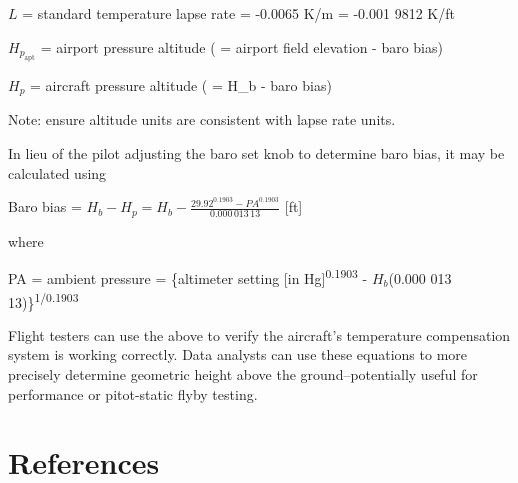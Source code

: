 \documentclass[
]{book}
\begin{document}
\(L\) = standard temperature lapse rate = -0.0065 K/m = -0.001 9812 K/ft

\(H_{p_{\mathrm{apt}}}\) = airport pressure altitude ( = airport field elevation - baro bias)

\(H_p\) = aircraft pressure altitude ( = H\_b - baro bias)

Note: ensure altitude units are consistent with lapse rate units.

In lieu of the pilot adjusting the baro set knob to determine baro bias, it may be calculated using

Baro bias = \(H_b - H_p = H_b - \frac{29.92^{0.1903} - PA^{0.1903}}{0.000\,013\,13}\) {[}ft{]}

where

PA = ambient pressure = \{altimeter setting {[}in Hg{]}\textsuperscript{0.1903} - \(H_b\)(0.000 013 13)\}\textsuperscript{1/0.1903}

Flight testers can use the above to verify the aircraft's temperature compensation system is working correctly. Data analysts can use these equations to more precisely determine geometric height above the ground--potentially useful for performance or pitot-static flyby testing.

\hypertarget{references}{%
\section{References}\label{references}}
\end{document}
